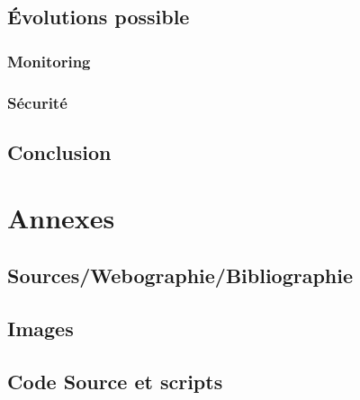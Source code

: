 \documentclass[a4paper,12pt,one side,titlepage]{report}
\begin{document}
\chapter{Évolutions possible}
\section{Monitoring}
\section{Sécurité}

\chapter{Conclusion}

\part{Annexes}
\chapter{Sources/Webographie/Bibliographie}

\chapter{Images}

\chapter{Code Source et scripts}




\printglossaries
\end{document}
